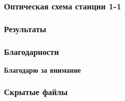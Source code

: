 \documentclass[14pt, hyperref = {colorlinks}]{beamer}
\begin{document}
\small
\begin{frame}
\frametitle{Оптическая схема станции 1-1}\label{t1}
\begin{figure}[h]
\end{figure}
\end{frame}

\small
\begin{frame}
\frametitle{Результаты}\label{t1}
\begin{figure}[h]
\end{figure}
\end{frame}

\small
\begin{frame}
\frametitle{Благодарности}\label{t1}
\begin{figure}[h]
\end{figure}
\end{frame}

\begin{frame}
\begin{center}
	\textbf{Благодарю за внимание}
\end{center}
\end{frame}

\small
\begin{frame}
\frametitle{Скрытые файлы}\label{t1}
\begin{figure}[h]
\end{figure}
\end{frame}
\end{document}
